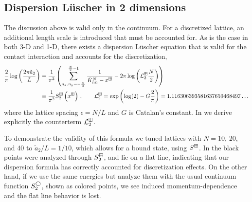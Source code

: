 \subsection{Dispersion L\"uscher in 2 dimensions}

The discussion above is valid only in the continuum.
For a discretized lattice, an additional length scale is introduced that must be accounted for.
As is the case in both 3-D and 1-D, there exists a dispersion L\"uscher equation that is valid for the contact interaction and accounts for the discretization,
\begin{align}
    \frac{2}{\pi} \log \left(\frac{2\pi \tilde a_{2}}{L}\right)
    &=
    \frac{1}{\pi^2}
    \left(
        \sum_{n_x,n_y=-\frac{N}{2}}^{\frac{N}{2}-1}\frac{1}{\tilde{K}^N_{nn}-x^\boxplus}
        -2\pi \log \left(\mathcal{L}^\boxplus_2\frac{N}{2}\right)
    \right)
    \nonumber\\
    &\equiv\frac{1}{\pi^2}S^{\boxplus}_2\left(x^\boxplus\right)\, ,\label{eq:2d dispersion luscher}
	\qquad
    \mathcal{L}^\boxplus_{2}
    =
    \exp \left(\log (2)-G \frac{2}{\pi}\right)
    =
    1.116306393581637659468497 \ldots
\end{align}
where the lattice spacing $\epsilon=N/L$ and $G$ is Catalan's constant.  In  we derive explicitly the counterterm $\mathcal{L}^\boxplus_{2}$.

To demonstrate the validity of this formula we tuned lattices with $N=10$, 20, and 40 to $\tilde a_{2}/L = {1}/{10}$, which allows for a bound state, using $S^{\boxplus}$.
In  the black points were analyzed through $S^\boxplus_2$, and lie on a flat line, indicating that our dispersion \Luscher formula has correctly accounted for discretization effects.
On the other hand, if we use the same energies but analyze them with the usual continuum \Luscher function $S^{\bigcirc}_2$, shown as colored points, we see induced momentum-dependence and the flat line behavior is lost.

